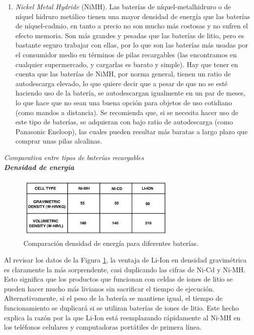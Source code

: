 \documentclass[12pt]{article}
\begin{document}
\begin{enumerate}
		\item \textit{Nickel Metal Hydride} (NiMH). Las baterías de níquel-metalhidruro o de níquel hidruro metálico tienen una mayor densidad de energía que las baterías de níquel-cadmio, en tanto a precio no son mucho más costosas y no sufren el efecto memoria. Son más grandes y pesadas que las baterías de litio, pero es bastante seguro trabajar con ellas, por lo que son las baterías más usadas por el consumidor medio en términos de pilas recargables (las encontramos en cualquier supermercado, y cargarlas es barato y simple). Hay que tener en cuenta que las baterías de NiMH, por norma general, tienen un ratio de autodescarga elevado, lo que quiere decir que a pesar de que no se esté haciendo uso de la batería, se autodescargan igualmente en un par de meses, lo que hace que no sean una buena opción para objetos de uso cotidiano (como mandos a distancia). Se recomienda que, si se necesita hacer uso de este tipo de baterías, se adquieran con bajo ratio de autodescarga (como Panasonic Eneloop), las cuales pueden resultar más baratas a largo plazo que comprar unas pilas alcalinas.
		
	\end{enumerate}
	
	\noindent \textit{Comparativa entre tipos de baterías recargables} \\
	
	\noindent \textit{\textbf{Densidad de energía}}
	
		\begin{figure}[h]
		\begin{center}
			\includegraphics[width=0.7\textwidth]{img/energyDensityComparison_TxInst.png}
			\caption{Comparación densidad de energía para diferentes baterías.}
			\label{fig: comparación densidad energía}
		\end{center}
	\end{figure}
	
	 
	
	\noindent Al revisar los datos de la Figura \ref{fig: comparación densidad energía}, la ventaja de Li-Ion en densidad gravimétrica es claramente la más sorprendente, casi duplicando las cifras de Ni-Cd y Ni-MH. Esto significa que los productos que funcionan con celdas de iones de litio se pueden hacer mucho más livianos sin sacrificar el tiempo de ejecución. Alternativamente, si el peso de la batería se mantiene igual, el tiempo de funcionamiento se duplicará si se utilizan baterías de iones de litio. Este hecho explica la razón por la que Li-Ion está reemplazando rápidamente al Ni-MH en los teléfonos celulares y computadoras portátiles de primera línea. \\
	
\end{document}
